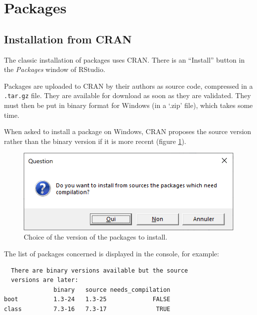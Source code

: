 \documentclass[
  12pt,
  american,
  a4paper,
  extrafontsizes,onecolumn,openright
  ]{memoir}
\begin{document}
\normalsize

\hypertarget{packages}{%
\section{Packages}\label{packages}}

\hypertarget{installation-from-cran}{%
\subsection{Installation from CRAN}\label{installation-from-cran}}

The classic installation of packages uses CRAN.
There is an \enquote{Install} button in the \emph{Packages} window of RStudio.

Packages are uploaded to CRAN by their authors as source code, compressed in a \texttt{.tar.gz} file.
They are available for download as soon as they are validated.
They must then be put in binary format for Windows (in a `.zip' file), which takes some time.

When asked to install a package on Windows, CRAN proposes the source version rather than the binary version if it is more recent (figure \ref{fig:R-BinaryPkg}).



\scriptsize

\begin{figure}

{\centering \includegraphics[width=0.8\linewidth]{images/R-BinaryPkg} 

}

\caption{Choice of the version of the packages to install.}\label{fig:R-BinaryPkg}
\end{figure}

\normalsize

The list of packages concerned is displayed in the console, for example:

\begin{verbatim}
  There are binary versions available but the source 
  versions are later:
              binary   source needs_compilation
boot          1.3-24   1.3-25             FALSE
class         7.3-16   7.3-17              TRUE
\end{verbatim}
\end{document}
